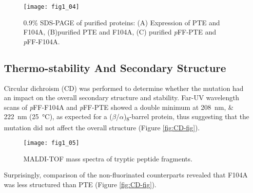 \begin{refsection}
\begin{figure}[h!] \centering \texttt{[image: fig1\_04]}
    \caption[0.9\% SDS-PAGE of purified proteins: (A) Expression of PTE and
    F104A, (B)purified PTE and F104A, (C) purified \emph{p}FF-PTE and
\emph{p}FF-F104A.]{0.9\% SDS-PAGE of purified proteins: (A) Expression of PTE
    and F104A, (B)purified PTE and F104A, (C) purified \emph{p}FF-PTE and
    \emph{p}FF-F104A.} 
    \label{fig:sds-gel}
\end{figure}

\subsection{Thermo-stability And Secondary Structure}

Circular dichroism (CD) was performed to determine whether the mutation had an
impact on the overall secondary structure and stability. Far-UV wavelength
scans of \emph{p}FF-F104A and \emph{p}FF-PTE showed a double minimum at
\SIlist{208;222}{\nm} (\SI{25}{\celsius}), as expected for a
($\beta$/$\alpha$)\textsubscript{8}-barrel protein, thus suggesting that the
mutation did not affect the overall structure (Figure \ref{fig:CD-fig}).  
\begin{figure}[h!] \centering \texttt{[image: fig1\_05]}
    \caption[MALDI-TOF mass spectra of tryptic peptide fragments.]{MALDI-TOF
    mass spectra of tryptic peptide fragments.} \label{fig:MALDI-fig} 
\end{figure}

Surprisingly, comparison of the non-fluorinated counterparts revealed that
F104A was less structured than PTE (Figure \ref{fig:CD-fig}). 


\end{refsection}
